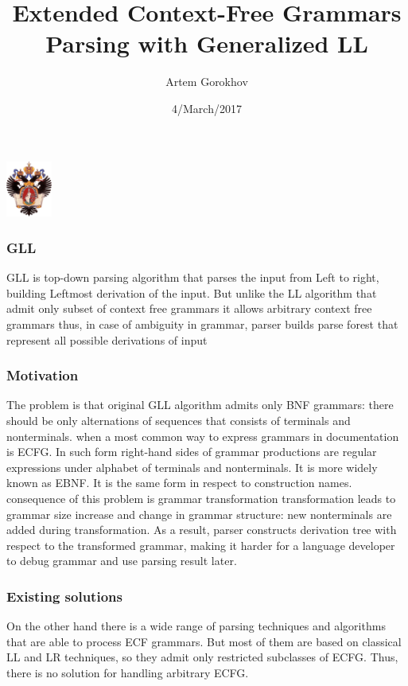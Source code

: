 \documentclass{beamer}
\title[]{Extended Context-Free Grammars Parsing with Generalized LL}
\institute[SPBU]{ 
	Saint Petersburg State University \\ 
	Programming Languages and Tools Lab, JetBrains}
\author[Artem Gorokhov]{Artem Gorokhov}
\date{4/March/2017}
\begin{document}
 
	
	
	\begin{frame} 
		\begin{center} 
			{\includegraphics[width=1.5cm]{pictures/SPbGU_Logo.png}} 
		\end{center} 
		\titlepage 
	\end{frame} 
	
	\begin{frame} 
		\frametitle{GLL}
		GLL is top-down parsing algorithm that parses the input from Left to right, 
		building Leftmost derivation of the input.
		But unlike the LL algorithm that admit only subset of context free grammars it
		allows arbitrary context free grammars
		thus, in case of ambiguity in grammar, 
		parser builds parse forest that represent all possible derivations of input
	\end{frame}
	
	\begin{frame} 
		\frametitle{Motivation} 
		The problem is that original GLL algorithm admits only BNF grammars: 
		there should be only alternations of sequences that consists of terminals and nonterminals. 
		when a most common way to express grammars in documentation is ECFG. In such form
		right-hand sides of grammar productions are regular expressions under alphabet of terminals and nonterminals. 
		It is more widely known as EBNF. It is the same form in respect to construction names. 
		consequence of this problem is grammar transformation 
		transformation leads to grammar size increase and change in grammar
		structure: new nonterminals are added during transformation. As a result, parser
		constructs derivation tree with respect to the transformed grammar, making it
		harder for a language developer to debug grammar and use parsing result later.
	\end{frame} 
	
	\begin{frame} 
		\frametitle{Existing solutions} 
		On the other hand there is a wide range of parsing techniques and algorithms that are able to process ECF grammars. 
		But most of them are based on classical LL and LR techniques, so they admit only restricted subclasses 
		of ECFG. Thus, there is no solution for handling arbitrary ECFG. 
	\end{frame}
\end{document}
